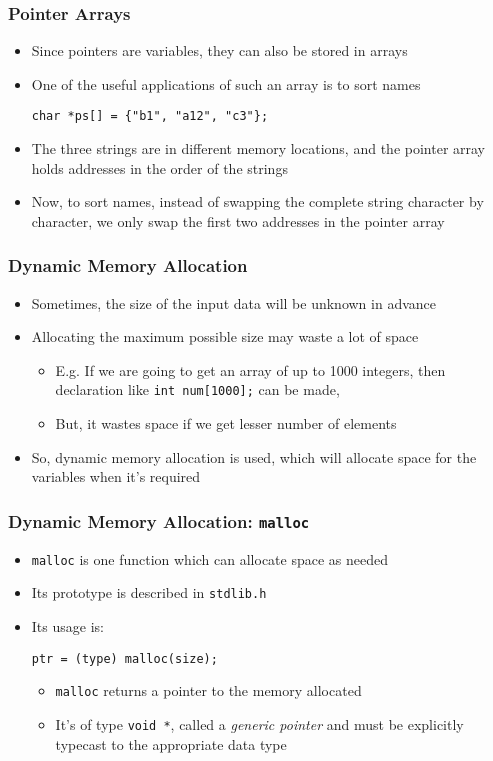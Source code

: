 \documentclass[11pt]{beamer}
\begin{document}
\begin{frame}[fragile]\frametitle{Pointer Arrays}
\label{sec-1-10}

\begin{itemize}
\item Since pointers are variables, they can also be stored in arrays
\item One of the useful applications of such an array is to sort names

\begin{verbatim}
char *ps[] = {"b1", "a12", "c3"};
\end{verbatim}
\item The three strings are in different memory locations, and the pointer array holds addresses in the order of the strings
\item Now, to sort names, instead of swapping the complete string character by character, we only swap the first two addresses in the pointer array
\end{itemize}
\end{frame}
\begin{frame}[fragile]\frametitle{Dynamic Memory Allocation}
\label{sec-1-11}

\begin{itemize}
\item Sometimes, the size of the input data will be unknown in advance
\item Allocating the maximum possible size may waste a lot of space
\begin{itemize}
\item E.g. If we are going to get an array of up to 1000 integers, then declaration like \verb~int num[1000];~ can be made,
\item But, it wastes space if we get lesser number of elements
\end{itemize}
\item So, dynamic memory allocation is used, which will allocate space for the variables when it's required
\end{itemize}
\end{frame}
\begin{frame}[fragile]\frametitle{Dynamic Memory Allocation: \verb~malloc~}
\label{sec-1-12}

\begin{itemize}
\item \verb~malloc~ is one function which can allocate space as needed
\item Its prototype is described in \verb~stdlib.h~
\item Its usage is:

\begin{verbatim}
ptr = (type) malloc(size);
\end{verbatim}
\begin{itemize}
\item \verb~malloc~ returns a pointer to the memory allocated
\item It's of type \verb~void *~, called a \emph{generic pointer} and must be explicitly typecast to the appropriate data type
\end{itemize}
\end{itemize}
\end{frame}
\end{document}

